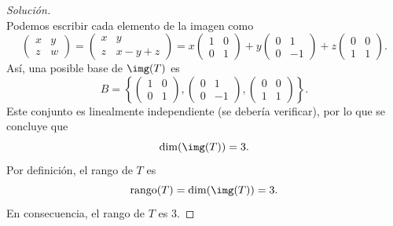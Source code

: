 \documentclass[a4,11pt]{aleph-notas}
\begin{document}
\begin{proof}[Solución]
\[    \]
    Podemos escribir cada elemento de la imagen como
    \[
        \begin{pmatrix}x & y\\
            z & w
            \end{pmatrix}=
        \begin{pmatrix}x & y \\
            z & x-y+z
            \end{pmatrix}=
        x\begin{pmatrix}1 & 0\\
            0 & 1
            \end{pmatrix}+
        y\begin{pmatrix}0 & 1\\
            0 & -1
            \end{pmatrix}+
        z\begin{pmatrix}0 & 0\\
            1 & 1
            \end{pmatrix}.
    \]
    Así, una posible base de $\img(T)$ es
    \[
        B=\left\{\begin{pmatrix}1 & 0\\
            0 & 1
            \end{pmatrix},\begin{pmatrix}0 & 1\\
            0 & -1
            \end{pmatrix},\begin{pmatrix}0 & 0\\
            1 & 1
            \end{pmatrix}\right\}.
    \]
    Este conjunto es linealmente independiente (se debería verificar), por lo que se concluye que
    \[
        \dim(\img(T))=3.
    \]
    Por definición, el rango de $T$ es
    \[
        \operatorname{rango}(T)=\dim(\img(T))=3.
    \]
    En consecuencia, el rango de $T$ es $3$.\qedhere
\end{proof}
\end{document}
